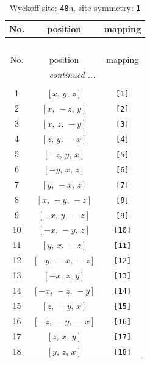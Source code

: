 \documentclass[fleqn,8pt]{jsarticle}
\begin{document}
\renewcommand{\arraystretch}{1.2}
\begin{longtable}{ccc}
\caption{Wyckoff site: {\tt 48n}, site symmetry: {\tt 1}}
 \\
 \hline \hline
No. & position & mapping \\ \hline \endfirsthead

\multicolumn{2}{l}{\tablename\ \thetable{}} \\
 \hline \hline
No. & position & mapping \\ \hline \endhead

 \hline \hline
\multicolumn{2}{r}{\footnotesize\it continued ...} \\ \endfoot

 \hline \hline
\multicolumn{2}{r}{} \\ \endlastfoot

1 & $\left[ x,\, y,\, z \right]$ & {\tt [1]} \\ \hline
2 & $\left[ x,\, - z,\, y \right]$ & {\tt [2]} \\ \hline
3 & $\left[ x,\, z,\, - y \right]$ & {\tt [3]} \\ \hline
4 & $\left[ z,\, y,\, - x \right]$ & {\tt [4]} \\ \hline
5 & $\left[ - z,\, y,\, x \right]$ & {\tt [5]} \\ \hline
6 & $\left[ - y,\, x,\, z \right]$ & {\tt [6]} \\ \hline
7 & $\left[ y,\, - x,\, z \right]$ & {\tt [7]} \\ \hline
8 & $\left[ x,\, - y,\, - z \right]$ & {\tt [8]} \\ \hline
9 & $\left[ - x,\, y,\, - z \right]$ & {\tt [9]} \\ \hline
10 & $\left[ - x,\, - y,\, z \right]$ & {\tt [10]} \\ \hline
11 & $\left[ y,\, x,\, - z \right]$ & {\tt [11]} \\ \hline
12 & $\left[ - y,\, - x,\, - z \right]$ & {\tt [12]} \\ \hline
13 & $\left[ - x,\, z,\, y \right]$ & {\tt [13]} \\ \hline
14 & $\left[ - x,\, - z,\, - y \right]$ & {\tt [14]} \\ \hline
15 & $\left[ z,\, - y,\, x \right]$ & {\tt [15]} \\ \hline
16 & $\left[ - z,\, - y,\, - x \right]$ & {\tt [16]} \\ \hline
17 & $\left[ z,\, x,\, y \right]$ & {\tt [17]} \\ \hline
18 & $\left[ y,\, z,\, x \right]$ & {\tt [18]} \\ \hline

\end{longtable}
\end{document}
